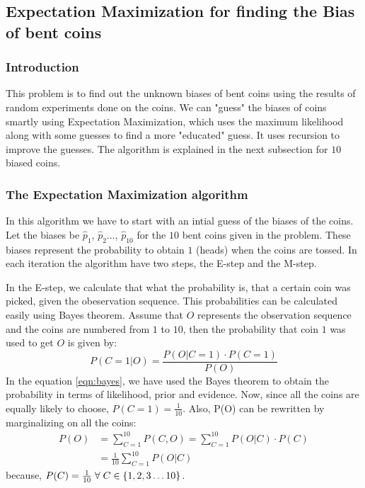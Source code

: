 \documentclass[journal, compsoc]{IEEEtran}
\begin{document}
\subsection{Expectation Maximization for finding the Bias of bent coins}
\subsubsection{Introduction}
This problem is to find out the unknown biases of bent coins using the results of random experiments done on the coins.
We can "guess" the biases of coins smartly using Expectation Maximization, which uses the maximum likelihood along with some guesses
to find a more "educated" guess. It uses recursion to improve the guesses. The algorithm is explained in the next subsection for $10$ biased coins.
\subsubsection{The Expectation Maximization algorithm}
In this algorithm we have to start with an intial guess of the biases of the coins. Let the biases be $\hat{p}_{1}$, $\hat{p}_{2} \ldots$, $\hat{p}_{10}$ for the $10$
bent coins given in the problem. These biases represent the probability to obtain $1$ (heads) when the coins are tossed. In each iteration the algorithm
have two steps, the E-step and the M-step.

In the E-step, we calculate that what the probability is, that a certain coin was picked, given the obeservation sequence. This probabilities can be
calculated easily using Bayes theorem. Assume that $O$ represents the observation sequence and the coins are numbered from $1$ to $10$, then the
probability that coin $1$ was used to get $O$ is given by:
\begin{equation}
\label{eqn:bayes}
    P(C = 1 | O) = \frac{P(O | C = 1) \cdot P(C = 1)}{P(O)}
\end{equation}
In the equation \ref{eqn:bayes}, we have used the Bayes theorem to obtain the probability in terms of likelihood, prior and evidence. Now,
since all the coins are equally likely to choose, ${P(C = 1) = \frac{1}{10}}$. Also, P(O) can be rewritten by marginalizing on all the coins:
\begin{equation}
\label{eqn:marginalization}
\begin{aligned}
P(O) &= \sum_{C = 1}^{10} P(C, O) = \sum_{C = 1}^{10} P(O | C) \cdot P(C)\\
&= \frac{1}{10} \sum_{C = 1}^{10} P(O | C)
\end{aligned}
\end{equation}
because, ${P(C) = \frac{1}{10} \hspace{1mm} \forall \hspace{1mm} C \in \{1, 2, 3 \ldots 10\}}$.
\end{document}

